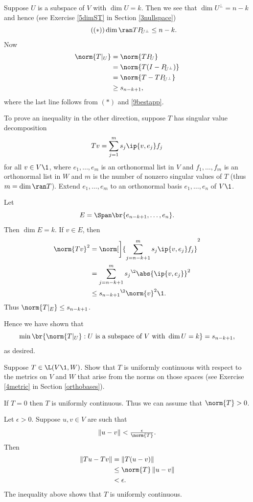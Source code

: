 \begin{Solution}
Suppose $U$ is a subspace of $V$ with $\dim U = k$. Then we see that
$\dim U^\perp = n-k$ and hence (see Exercise \ref{5dimST} in Section \ref{3nullspace})
\[ \tag{$(*)$}
\dim \ran TP_{\!U^\perp} \le n-k.
\]
Now
\begin{align*}
\norm{T|_U } &=\norm{TP_{\!U}} \\
&= \norm{ T (I - P_{\!U^\perp})}\\
&= \norm{ T - TP_{\!U^\perp} }\\
&\ge s_{n-k+1},
\end{align*}
where the last line follows from $(*)$ and  \ref{9bestapp}.

To prove an inequality in the other direction, suppose $T$ has singular value decomposition
\[
Tv = \sum_{j=1}^m s_j \ip{v, e_j} f_j
\]
for all $v \in V\1$, where $e_1, \ldots, e_m$ is an orthonormal list in $V$ and $f_1, \ldots, f_m$ is an orthonormal list in $W$ and $m$ is the number of nonzero singular values of $T$ (thus $m = \dim \ran T$). Extend $e_1, \ldots, e_m$ to an orthonormal basis $e_1, \ldots, e_n$ of $V\1$.

Let
\[
E = \Span \br{e_{n-k+1}, \ldots, e_n}.
\]
Then $\dim E = k$. If $v \in E$, then
\begin{align*}
\norm{Tv}^2 &= \norm[\bigg]{ \sum_{j=n-k+1}^m s_j \ip{v, e_j} f_j}^2 \\[1bp]
&= \sum_{j=n-k+1}^m {s_j}^{\2} \abs{\ip{v, e_j}}^2 \\[1bp]
&\le {s_{n-k+1}}^{\2} \norm{v}^2\1.
\end{align*}
Thus $\norm{T|_E} \le s_{n-k+1}$.

Hence we have shown that
\[
\min \br{ \norm{T|_U} : U \text { is a subspace of } V \text{ with } \dim U = k} = s_{n-k+1},
\]
as desired.
\end{Solution}

\exercise
Suppose $T \in \L(V\1, W)$. Show that $T$ is uniformly continuous with respect to the metrics on $V$ and $W$ that arise from the norms on those spaces (see Exercise \ref{4metric} in Section \ref{orthobases}).

\begin{Solution}
If $T = 0$ then $T$ is uniformly continuous. Thus we can assume that $\norm{T} > 0$.

Let $\epsilon > 0$. Suppose $u, v \in V$ are such that
\[
\|u - v \| < \tfrac{\epsilon}{\norm{T}}.
\]
Then
\begin{align*}
\|Tu - Tv\| &= \|T(u - v) \| \\
&\le \norm{T} \, \|u- v\| \\
&<  \epsilon.
\end{align*}
The inequality above shows that $T$ is uniformly continuous.
\end{Solution}

